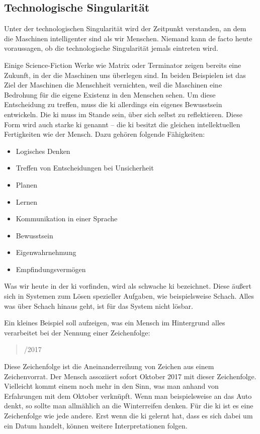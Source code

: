 \subsection{Technologische Singularität}
Unter der technologischen Singularität wird der Zeitpunkt verstanden, an dem die Maschinen intelligenter sind als wir Menschen. Niemand kann de facto heute voraussagen, ob die technologische Singularität jemals eintreten wird. 

Einige Science-Fiction Werke wie Matrix oder Terminator zeigen bereits eine Zukunft, in der die Maschinen uns überlegen sind. In beiden Beispielen ist das Ziel der Maschinen die Menschheit vernichten, weil die Maschinen eine Bedrohung für die eigene Existenz in den Menschen sehen. Um diese Entscheidung zu treffen, muss die \ac{ki} allerdings ein eigenes Bewusstsein entwickeln. Die \ac{ki} muss im Stande sein, über sich selbst zu reflektieren. Diese Form wird auch starke \ac{ki} genannt -- die \ac{ki} besitzt die gleichen intellektuellen Fertigkeiten wie der Mensch. Dazu gehören folgende Fähigkeiten:
\begin{itemize}
	\item Logisches Denken
	\item Treffen von Entscheidungen bei Unsicherheit
	\item Planen      
	\item Lernen
	\item Kommunikation in einer Sprache
	\item Bewusstsein
	\item Eigenwahrnehmung
	\item Empfindungsvermögen
\end{itemize}
Was wir heute in der \ac{ki} vorfinden, wird als schwache \ac{ki} bezeichnet. Diese äußert sich in Systemen zum Lösen spezieller Aufgaben, wie beispielsweise Schach. Alles was über Schach hinaus geht, ist für das System nicht lösbar.

Ein kleines Beispiel soll aufzeigen, was ein Mensch im Hintergrund alles verarbeitet bei der Nennung einer Zeichenfolge:
\begin{quote}
	/2017 
\end{quote}
Diese Zeichenfolge ist die Aneinanderreihung von Zeichen aus einem Zeichenvorrat. Der Mensch assoziiert sofort Oktober 2017 mit dieser Zeichenfolge. Vielleicht kommt einem noch mehr in den Sinn, was man anhand von Erfahrungen mit dem Oktober verknüpft. Wenn man beispielsweise an das Auto denkt, so sollte man allmählich an die Winterreifen denken. 
Für die \ac{ki} ist es eine Zeichenfolge wie jede andere. Erst wenn die \ac{ki} gelernt hat, dass es sich dabei um ein Datum handelt, können weitere Interpretationen folgen. 


